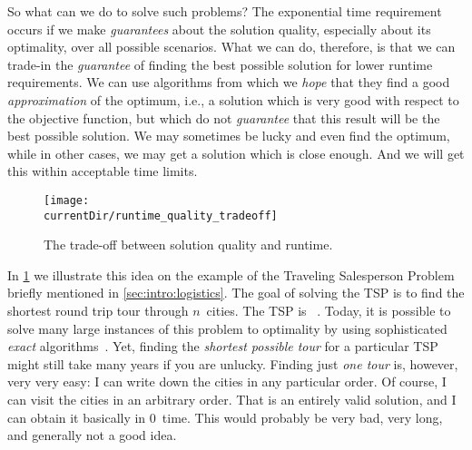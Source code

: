 So what can we do to solve such problems?
The exponential time requirement occurs if we make \emph{guarantees} about the solution quality, especially about its optimality, over all possible scenarios.
What we can do, therefore, is that we can trade-in the \emph{guarantee} of finding the best possible solution for lower runtime requirements.
We can use algorithms from which we \emph{hope} that they find a good \emph{approximation} of the optimum, i.e., a solution which is very good with respect to the objective function, but which do not \emph{guarantee} that this result will be the best possible solution.
We may sometimes be lucky and even find the optimum, while in other cases, we may get a solution which is close enough.
And we will get this within acceptable time limits.

\begin{figure}%
\centering%
\texttt{[image: \\currentDir/runtime\_quality\_tradeoff]}%
\caption{The trade-off between solution quality and runtime.}%
\label{fig:runtime_quality_tradeoff}%
\end{figure}

In \cref{fig:runtime_quality_tradeoff} we illustrate this idea on the example of the Traveling Salesperson Problem~\cite{ABCC2006TTSPACS,LLRKS1985TTSPAGTOCO,GP2002TTSPAIV} briefly mentioned in \cref{sec:intro:logistics}.
The goal of solving the \gls{TSP} is to find the shortest round trip tour through $n$~cities.
The \gls{TSP} is \NPhard~\cite{GJ1979CAIAGTTTONC,GP2002TTSPAIV}.
Today, it is possible to solve many large instances of this problem to optimality by using sophisticated \emph{exact} algorithms~\cite{CEG2007CWDPIFTSPT,C2021WT}.
Yet, finding the \emph{shortest possible tour} for a particular \gls{TSP} might still take many years if you are unlucky.
Finding just \emph{one tour} is, however, very very easy:
I can write down the cities in any particular order.
Of course, I can visit the cities in an arbitrary order.
That is an entirely valid solution, and I can obtain it basically in 0~time.
This  would probably be very bad, very long, and generally not a good idea.


